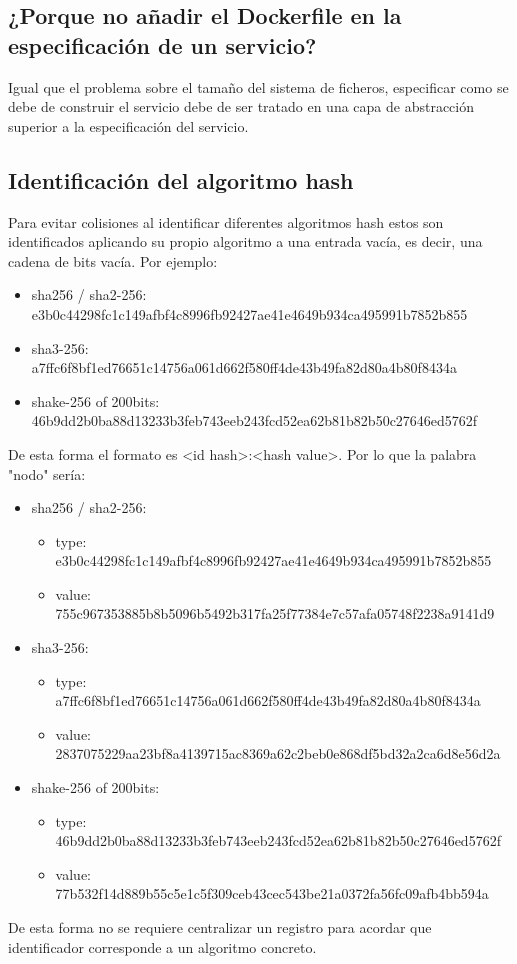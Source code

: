 \documentclass[11pt]{article}
\begin{document}
		\subsection{¿Porque no añadir el Dockerfile en la especificación de un servicio?}
			Igual que el problema sobre el tamaño del sistema de ficheros, especificar como se debe de construir el servicio debe de ser tratado en una capa
			de abstracción superior a la especificación del servicio. \\

		\subsection{Identificación del algoritmo hash}
			Para evitar colisiones al identificar diferentes algoritmos hash estos son identificados aplicando su propio algoritmo a una entrada vacía, es decir,
			una cadena de bits vacía.
			Por ejemplo:
			\begin{itemize}
				\item sha256 / sha2-256: e3b0c44298fc1c149afbf4c8996fb92427ae41e4649b934ca495991b7852b855
				\item sha3-256: a7ffc6f8bf1ed76651c14756a061d662f580ff4de43b49fa82d80a4b80f8434a
				\item shake-256 of 200bits: 46b9dd2b0ba88d13233b3feb743eeb243fcd52ea62b81b82b50c27646ed5762f \\
			\end{itemize} 

			De esta forma el formato es <id hash>:<hash value>.
			Por lo que la palabra "nodo" sería:
			\begin{itemize}
				\item sha256 / sha2-256:
					\begin{itemize}
						\item type: e3b0c44298fc1c149afbf4c8996fb92427ae41e4649b934ca495991b7852b855
						\item value: 755c967353885b8b5096b5492b317fa25f77384e7c57afa05748f2238a9141d9
					\end{itemize}
					\item sha3-256:
					\begin{itemize}
						\item type: a7ffc6f8bf1ed76651c14756a061d662f580ff4de43b49fa82d80a4b80f8434a
						\item value: 2837075229aa23bf8a4139715ac8369a62c2beb0e868df5bd32a2ca6d8e56d2a
					\end{itemize}
					\item  shake-256 of 200bits:
					\begin{itemize}
						\item type: 46b9dd2b0ba88d13233b3feb743eeb243fcd52ea62b81b82b50c27646ed5762f
						\item value: 77b532f14d889b55c5e1c5f309ceb43cec543be21a0372fa56fc09afb4bb594a
					\end{itemize}
			\end{itemize}
			De esta forma no se requiere centralizar un registro para acordar que identificador corresponde a un algoritmo concreto. \\
\end{document}
